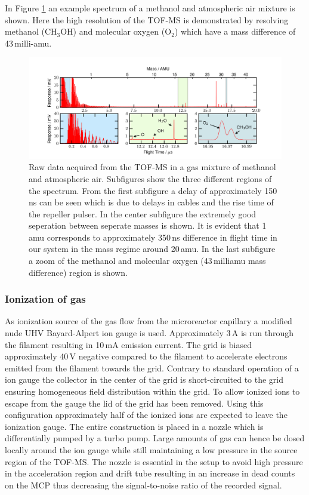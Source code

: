 \documentclass[aip,rsi]{revtex4-1}
\begin{document}
In Figure \ref{fig:untreated_data} an example spectrum of a methanol and atmospheric air mixture is shown. Here the high resolution of the TOF-MS is demonstrated by resolving methanol (CH$_3$OH) and molecular oxygen (O$_2$) which have a mass difference of 43\,milli-amu.
\begin{figure}
 \includegraphics[width=16cm]{untreated_data.png}%
 \caption{Raw data acquired from the TOF-MS in a gas mixture of methanol and atmospheric air. Subfigures show the three different regions of the spectrum. From the first subfigure a delay of approximately 150\,ns can be seen which is due to delays in cables and the rise time of the repeller pulser. In the center subfigure the extremely good seperation between seperate masses is shown. It is evident that 1\,amu corresponds to approximately 350\,ns difference in flight time in our system in the mass regime around 20\,amu. In the last subfigure a zoom of the methanol and molecular oxygen (43\,milliamu mass difference) region is shown.\label{fig:untreated_data}}%
\end{figure}

\subsubsection{Ionization of gas}
As ionization source of the gas flow from the microreactor capillary a modified nude UHV Bayard-Alpert ion gauge is used. Approximately 3\,A is run through the filament resulting in 10\,mA emission current. The grid is biased approximately 40\,V negative compared to the filament to accelerate electrons emitted from the filament towards the grid. Contrary to standard operation of a ion gauge the collector in the center of the grid is short-circuited to the grid ensuring homogeneous field distribution within the grid. To allow ionized ions to escape from the gauge the lid of the grid has been removed. Using this configuration approximately half of the ionized ions are expected to leave the ionization gauge\cite{Nottingham1955}. The entire construction is placed in a nozzle which is differentially pumped by a turbo pump. Large amounts of gas can hence be dosed locally around the ion gauge while still maintaining a low pressure in the source region of the TOF-MS. The nozzle is essential in the setup to avoid high pressure in the acceleration region and drift tube resulting in an increase in dead counts on the MCP thus decreasing the signal-to-noise ratio of the recorded signal.
\end{document}
